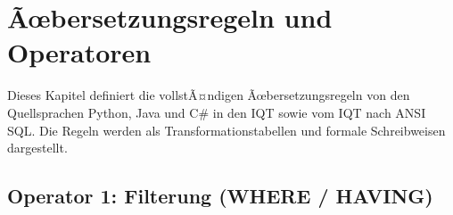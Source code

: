 ﻿%
\section{Ãœbersetzungsregeln und Operatoren}
\label{sec:operatoren}

Dieses Kapitel definiert die vollstÃ¤ndigen Ãœbersetzungsregeln von den
Quellsprachen Python, Java und C\# in den IQT sowie vom IQT nach ANSI SQL.
Die Regeln werden als Transformationstabellen und formale Schreibweisen
dargestellt.

\subsection{Operator 1: Filterung (WHERE / HAVING)}
\label{subsec:op_filter}

